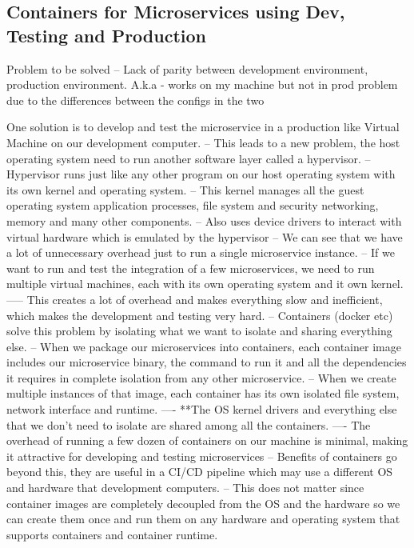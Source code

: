 \documentclass[a4paper, 11pt]{book}
\begin{document}
    \subsection{Containers for Microservices using Dev, Testing and Production}
    Problem to be solved -- Lack of parity between development environment, production environment.
    A.k.a - works on my machine but not in prod problem due to the differences between the configs in the two

    One solution is to develop and test the microservice in a production like Virtual Machine on our development computer.
    -- This leads to a new problem, the host operating system need to run another software layer called a hypervisor.
    -- Hypervisor runs just like any other program on our host operating system with its own kernel and operating system.
    -- This kernel manages all the guest operating system application processes, file system and security networking, memory and many other components.
    -- Also uses device drivers to interact with virtual hardware which is emulated by the hypervisor
    -- We can see that we have a lot of unnecessary overhead just to run a single microservice instance.
    -- If we want to run and test the integration of a few microservices, we need to run multiple virtual machines, each with its own operating system and it own kernel.
    ----- This creates a lot of overhead and makes everything slow and inefficient, which makes the development and testing very hard.
    -- Containers (docker etc) solve this problem by isolating what we want to isolate and sharing everything else.
    -- When we package our microservices into containers, each container image includes our microservice binary, the command to run it and all the dependencies it requires in complete isolation from any other microservice.
    -- When we create multiple instances of that image, each container has its own isolated file system, network interface and runtime.
    ---- **The OS kernel drivers and everything else that we don't need to isolate are shared among all the containers.
    ---- The overhead of running a few dozen of containers on our machine is minimal, making it attractive for developing and testing microservices
    -- Benefits of containers go beyond this, they are useful in a CI/CD pipeline which may use a different OS and hardware that development computers.
    -- This does not matter since container images are completely decoupled from the OS and the hardware so we can create them once and run them on any hardware and operating system that supports containers and container runtime.
\end{document}
